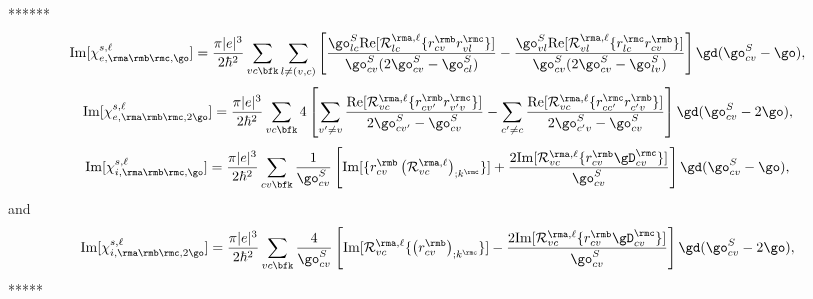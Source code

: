 ******
\begin{equation}\label{imchiewn}
\mathrm{Im}[\chi_{e,\rma\rmb\rmc,\go}^{s,\ell}]
=
\frac{\pi |e|^3}{2\hbar^2} 
\sum_{vc\bfk}
\sum_{l\neq(v,c)}
\left[
\frac{\go^S_{lc}\mathrm{Re}[{\cal R}^{\rma,\ell}_{lc}\{r^{\rmb}_{cv}r^{\rmc}_{vl}\}]}
{\go^S_{cv}(2\go^S_{cv}-\go^S_{cl})}
-
\frac{\go^S_{vl}\mathrm{Re}[{\cal R}^{\rma,\ell}_{vl}\{r^{\rmc}_{lc}r^{\rmb}_{cv}\}]}
{\go^S_{cv}(2\go^S_{cv}-\go^S_{lv})}
\right]
\gd(\go^S_{cv}-\go)
,
\end{equation}  
\begin{equation}\label{imchie2wn}
\mathrm{Im}[\chi_{e,\rma\rmb\rmc,2\go}^{s,\ell}]
=
\frac{\pi |e|^3}{2\hbar^2} 
\sum_{vc\bfk}
4
\left[
\sum_{v'\ne v}
\frac{\mathrm{Re}[{\cal
    R}^{\rma,\ell}_{vc}\{r^{\rmb}_{cv'}r^{\rmc}_{v'v}\}]}{2\go^S_{cv'}-\go^S_{cv}}
-
\sum_{c'\ne c}
\frac{\mathrm{Re}[{\cal R}^{\rma,\ell}_{vc}\{r^{\rmc}_{cc'}r^{\rmb}_{c'v}\}]}
{2\go^S_{c'v}-\go^S_{cv}}
\right]
\gd(\go^S_{cv}-2\go)
,
\end{equation}
\begin{equation}\label{imchiwn}
\mathrm{Im}[\chi_{i,\rma\rmb\rmc,\go}^{s,\ell}]
=
\frac{\pi|e|^3}{2\hbar^2}
\sum_{cv\bfk}
\frac{1}{\go^S_{cv}}
\left[
\mathrm{Im}[\{r^{\rmb}_{cv}\left({\cal R}^{\rma,\ell}_{vc}\right)_{;k^{\rmc}}\}]
+
\frac{2\mathrm{Im}[{\cal R}^{\rma,\ell}_{vc}\{r^{\rmb}_{cv}\gD^{\rmc}_{cv}\}]}{\go^S_{cv}}
\right]
\gd(\go^S_{cv}-\go)
,
\end{equation}
and
\begin{equation}\label{imchi2wn}
\mathrm{Im}[\chi_{i,\rma\rmb\rmc,2\go}^{s,\ell}]
=
\frac{\pi|e|^3}{2\hbar^2}\sum_{vc\bfk}
\frac{4}{\go^S_{cv}}
\left[
\mathrm{Im}[{\cal R}^{\rma,\ell}_{vc}\{\left(r^{\rmb}_{cv}\right)_{;k^{\rmc}}\}]
-
\frac{2\mathrm{Im}[{\cal R}^{\rma,\ell}_{vc}\{r^{\rmb}_{cv}\gD^{\rmc}_{cv}\}]}{\go^S_{cv}}
\right]\gd(\go^S_{cv}-2\go)
,
\end{equation}
*****
